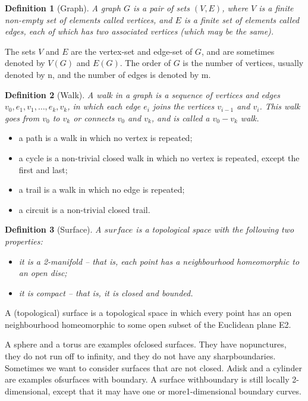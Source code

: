 \documentclass[10pt]{article}
\newtheorem{definition}{Definition}
\begin{document}
\begin{definition}[Graph]
A graph $G$ is a pair of sets $(V , E)$, where $V$ is a finite non-empty set of elements called vertices, and $E$ is a finite set of elements called edges, each of which has two associated vertices (which may be the same).
\end{definition}

The sets $V$ and $E$ are the vertex-set and edge-set of $G$, and are sometimes denoted by $V(G)$ and $E(G)$. The order of $G$ is the number of vertices, usually denoted by n, and the number of edges is denoted by m.

\begin{definition}[Walk]
A walk in a graph is a sequence of vertices and edges $v_0, e_1, v_1, \dots, e_k, v_k$, in which each edge $e_i$ joins the vertices $v_{i-1}$ and $v_i$. This walk goes from $v_0$ to $v_k$ or connects $v_0$ and $v_k$, and is called a $v_0-v_k$ walk.
\end{definition}

\begin{itemize}
    \item a path is a walk in which no vertex is repeated;
    \item a cycle is a non-trivial closed walk in which no vertex is repeated, except the first and last;
    \item a trail is a walk in which no edge is repeated;
    \item a circuit is a non-trivial closed trail.
\end{itemize}

\begin{definition}[Surface]
A $surface$ is a topological space with the following two properties:
    \begin{itemize}
        \item it is a 2-manifold – that is, each point has a neighbourhood homeomorphic to an open disc;
        \item it is compact – that is, it is closed and bounded.
    \end{itemize}
\end{definition}

A (topological) surface is a topological space in which every point has an open neighbourhood homeomorphic to some open subset of the Euclidean plane E2.

A sphere and a torus are examples ofclosed surfaces. They have nopunctures, they do not run off to infinity, and they do not have any sharpboundaries. Sometimes we want to consider surfaces that are not closed. Adisk and a cylinder are examples ofsurfaces with boundary. A surface withboundary is still locally 2-dimensional, except that it may have one or more1-dimensional boundary curves.
\end{document}
